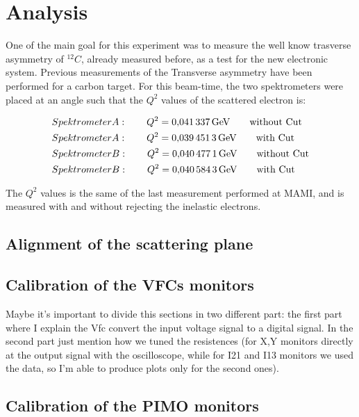 \section{Analysis}

One of the main goal for this experiment was to measure the well know trasverse asymmetry of $^{12}C$, already measured before, as a test for the new electronic system. Previous measurements of the Transverse asymmetry have been performed for a carbon target. For this beam-time, the two spektrometers were placed at an angle such that the $Q^{2}$ values of the scattered electron is:

\begin{flushleft}
\begin{align*}
& Spektrometer A : \qquad Q^{2} = \SI{0.041337}{\giga \electronvolt} \qquad \textnormal{without Cut} \\
& Spektrometer A : \qquad Q^{2} = \SI{0.0394513}{\giga \electronvolt} \qquad \textnormal{with Cut} \\
& Spektrometer B : \qquad Q^{2} = \SI{0.0404771}{\giga \electronvolt} \qquad \textnormal{without Cut} \\
& Spektrometer B : \qquad Q^{2} = \SI{0.0405843}{\giga \electronvolt} \qquad \textnormal{with Cut} 
\end{align*} 
\end{flushleft}

The $Q^{2}$ values is the same of the last measurement performed at MAMI, and is measured with and without rejecting the inelastic electrons. 

\subsection{Alignment of the scattering plane}

\subsection{Calibration of the VFCs monitors}
Maybe it's important to divide this sections in two different part: the first part where I explain the Vfc convert the input voltage signal to a digital signal. In the second part just mention how we tuned the resistences (for X,Y monitors directly at the output signal with the oscilloscope, while for I21 and I13 monitors we used the data, so I'm able to produce plots only for the second ones).

\subsection{Calibration of the PIMO monitors}

